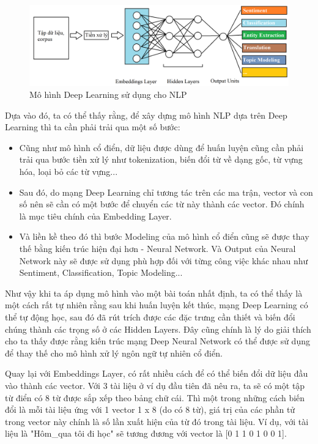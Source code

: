 \begin{figure}[h!]
\begin{center}
	\includegraphics[width=1.0\textwidth]{books/artificial-neural-network/chapter04/figure/nlp-deep-model.png}
	\caption{Mô hình Deep Learning sử dụng cho NLP}
	\label{fig:deep-learning-based-nlp}
\end{center}
\end{figure}

Dựa vào đó, ta có thể thấy rằng, để xây dựng mô hình NLP dựa trên Deep Learning thì ta cần phải trải qua một số bước:
\begin{itemize}
    \item Cũng như mô hình cổ điển, dữ liệu được dùng để huấn luyện cũng cần phải trải qua bước tiền xử lý như tokenization, biến đổi từ về dạng gốc, từ vựng hóa, loại bỏ các từ vựng...
    \item Sau đó, do mạng Deep Learning chỉ tương tác trên các ma trận, vector và con số nên sẽ cần có một bước để chuyển các từ này thành các vector. Đó chính là mục tiêu chính của Embedding Layer.
    \item Và liền kề theo đó thì bước Modeling của mô hình cổ điển cũng sẽ được thay thế bằng kiến trúc hiện đại hơn - Neural Network. Và Output của Neural Network này sẽ được sử dụng phù hợp đối với từng công việc khác nhau như Sentiment, Classification, Topic Modeling...
\end{itemize}

Như vậy khi ta áp dụng mô hình vào một bài toán nhất định, ta có thể thấy là một cách rất tự nhiên rằng sau khi huấn luyện kết thúc, mạng Deep Learning có thể tự động học, sau đó đã rút trích được các đặc trưng cần thiết và biến đổi chúng thành các trọng số  ở các Hidden Layers. Đây cũng chính là lý do giải thích cho ta thấy được rằng kiến trúc mạng Deep Neural Network có thể được sử dụng để thay thế cho mô hình xử lý ngôn ngữ tự nhiên cổ điển.

Quay lại với Embeddings Layer, có rất nhiều cách để có thể biến đổi dữ liệu đầu vào thành các vector. Với 3 tài liệu ở ví dụ đầu tiên đã nêu ra, ta sẽ có một tập từ điển có 8 từ được sắp xếp theo bảng chữ cái. Thì một trong những cách biến đổi là mỗi tài liệu ứng với 1 vector 1 x 8 (do có 8 từ), giá trị của các phần tử trong vector này chính là số lần xuất hiện của từ đó trong tài liệu. Ví dụ, với tài liệu là "Hôm\_qua tôi đi học" sẽ tương đương với vector là [0 1 1 0 1 0 0 1].

